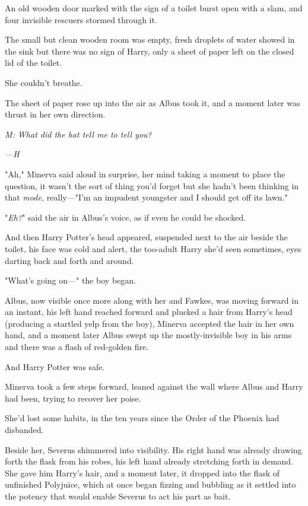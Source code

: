 An old wooden door marked with the sign of a toilet burst open with a slam, and
four invisible rescuers stormed through it.

The small but clean wooden room was empty, fresh droplets of water showed in
the sink but there was no sign of Harry, only a sheet of paper left on the
closed lid of the toilet.

She couldn't breathe.

The sheet of paper rose up into the air as Albus took it, and a moment later
was thrust in her own direction.

\emph{M: What did the hat tell me to tell you?}

\emph{---H}

"Ah," Minerva said aloud in surprise, her mind taking a moment to place the
question, it wasn't the sort of thing you'd forget but she hadn't been thinking
in that \emph{mode,} really---"I'm an impudent youngster and I should get off
its lawn."

"\emph{Eh?}" said the air in Albus's voice, as if even he could be shocked.

And then Harry Potter's head appeared, suspended next to the air beside the
toilet, his face was cold and alert, the too-adult Harry she'd seen sometimes,
eyes darting back and forth and around.

"What's going on---" the boy began.

Albus, now visible once more along with her and Fawkes, was moving forward in
an instant, his left hand reached forward and plucked a hair from Harry's head
(producing a startled yelp from the boy), Minerva accepted the hair in her own
hand, and a moment later Albus swept up the mostly-invisible boy in his arms
and there was a flash of red-golden fire.

And Harry Potter was safe.

Minerva took a few steps forward, leaned against the wall where Albus and Harry
had been, trying to recover her poise.

She'd{\el} lost some habits, in the ten years since the Order of the Phoenix
had disbanded.

Beside her, Severus shimmered into visibility. His right hand was already
drawing forth the flask from his robes, his left hand already stretching forth
in demand. She gave him Harry's hair, and a moment later, it dropped into the
flask of unfinished Polyjuice, which at once began fizzing and bubbling as it
settled into the potency that would enable Severus to act his part as bait.

